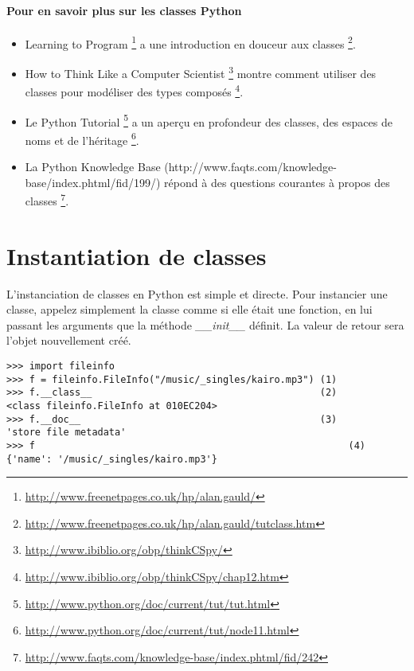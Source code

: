 \paragraph{Pour en savoir plus sur les classes Python}
\begin{itemize}
  \item Learning to Program \footnote{\url{http://www.freenetpages.co.uk/hp/alan.gauld/}} a une introduction en douceur aux classes \footnote{\url{http://www.freenetpages.co.uk/hp/alan.gauld/tutclass.htm}}.
  \item How to Think Like a Computer Scientist \footnote{\url{http://www.ibiblio.org/obp/thinkCSpy/}} montre comment utiliser des classes pour modéliser des types composés \footnote{\url{http://www.ibiblio.org/obp/thinkCSpy/chap12.htm}}.
  \item Le Python Tutorial \footnote{\url{http://www.python.org/doc/current/tut/tut.html}} a un aperçu en profondeur des classes, des espaces de noms et de l'héritage \footnote{\url{http://www.python.org/doc/current/tut/node11.html}}.
  \item La Python Knowledge Base (http://www.faqts.com/knowledge-base/index.phtml/fid/199/) répond à des questions courantes à propos des classes \footnote{\url{http://www.faqts.com/knowledge-base/index.phtml/fid/242}}.
\end{itemize}

\section{Instantiation de classes}

L'instanciation de classes en Python est simple et directe. Pour instancier une classe, appelez simplement la classe comme si elle était une fonction, en lui passant les arguments que la méthode \emph{\_\_init\_\_} définit. La valeur de retour sera l'objet nouvellement créé.

\begin{example}
\begin{lstlisting}
>>> import fileinfo
>>> f = fileinfo.FileInfo("/music/_singles/kairo.mp3") (1)
>>> f.__class__                                        (2)
<class fileinfo.FileInfo at 010EC204>
>>> f.__doc__                                          (3)
'store file metadata'
>>> f                                                       (4)
{'name': '/music/_singles/kairo.mp3'}
\end{lstlisting}
\end{example}

